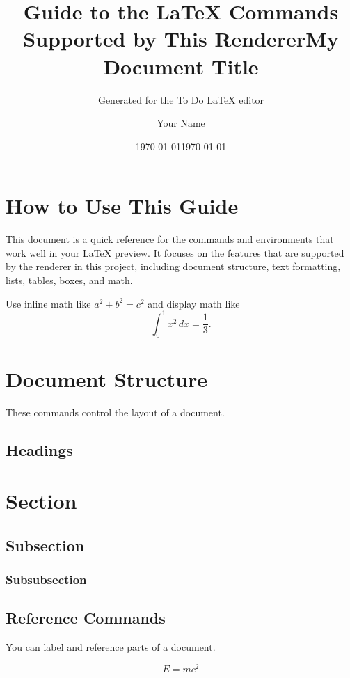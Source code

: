 \documentclass{article}
\title{Guide to the LaTeX Commands Supported by This Renderer}
\author{Generated for the To Do LaTeX editor}
\date{\today}
\begin{document}
\maketitle
\tableofcontents

\section{How to Use This Guide}
This document is a quick reference for the commands and environments that work well in your LaTeX preview. It focuses on the features that are supported by the renderer in this project, including document structure, text formatting, lists, tables, boxes, and math.

Use inline math like $a^2+b^2=c^2$ and display math like
\[
\int_0^1 x^2\,dx = \frac{1}{3}.
\]

\section{Document Structure}
These commands control the layout of a document.

\title{My Document Title}
\author{Your Name}
\date{\today}
\maketitle

\subsection{Headings}
\section{Section}
\subsection{Subsection}
\subsubsection{Subsubsection}

\subsection{Reference Commands}
You can label and reference parts of a document.

\begin{equation}
E = mc^2
\label{eq:einstein}
\end{equation}
\end{document}
